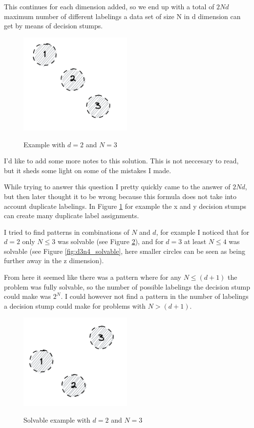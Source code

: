 \documentclass[11pt,a4paper]{article}
\begin{document}
This continues for each dimension added, so we end up with a total of $2Nd$ maximum number of different labelings a data set of size N in d dimension can get by means of decision stumps.


\begin{figure}[h]
    \caption{Example with $d=2$ and $N=3$}
    \centering
    \includegraphics[width=0.5\textwidth]{d2n3_unlabeled.png}
    \label{fig:d2n3}
\end{figure}

I'd like to add some more notes to this solution. This is not neccesary to read, but it sheds some light on some of the mistakes I made. 

While trying to answer this question I pretty quickly came to the answer of $2Nd$, but then later thought it to be wrong because this formula does not take into account duplicate labelings. In Figure \ref{fig:d2n3} for example the x and y decision stumps can create many duplicate label assignments. 

I tried to find patterns in combinations of $N$ and $d$, for example I noticed that for $d=2$ only $N \leq 3$ was solvable (see Figure \ref{fig:d2n3_solvable}), and for $d=3$ at least $N \leq 4$ was solvable (see Figure \ref{fig:d3n4_solvable}, here smaller circles can be seen as being further away in the z dimension). 

From here it seemed like there was a pattern where for any $N \leq (d+1)$ the problem was fully solvable, so the number of possible labelings the decision stump could make was $2^N$. I could however not find a pattern in the number of labelings a decision stump could make for problems with $N > (d+1)$.

\begin{figure}[h]
    \caption{Solvable example with $d=2$ and $N=3$}
    \centering
    \includegraphics[width=0.5\textwidth]{d2n3_solvable.png}
    \label{fig:d2n3_solvable}
\end{figure}
\end{document}
